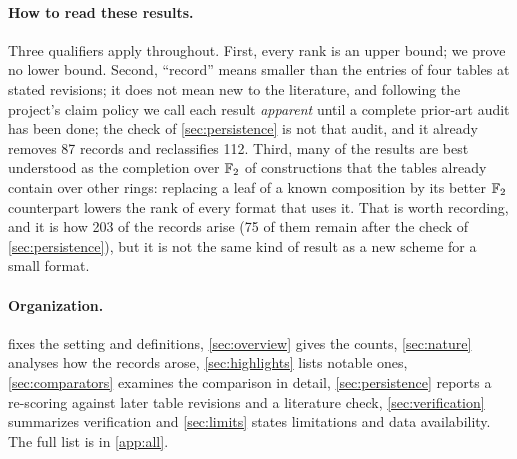\paragraph{How to read these results.}
Three qualifiers apply throughout. First, every rank is an upper bound; we prove no lower bound. Second, ``record'' means smaller than the entries of four tables at stated revisions; it does not mean new to the literature, and following the project's claim policy we call each result \emph{apparent} until a complete prior-art audit has been done; the check of \cref{sec:persistence} is not that audit, and it already removes 87 records and reclassifies 112.
Third, many of the results are best understood as the completion over ${\mathbb{F}_2}$ of constructions that the tables already contain over other rings: replacing a leaf of a known composition by its better ${\mathbb{F}_2}$ counterpart lowers the rank of every format that uses it.
That is worth recording, and it is how 203 of the records arise (75 of them remain after the check of \cref{sec:persistence}), but it is not the same kind of result as a new scheme for a small format.

\paragraph{Organization.}
 fixes the setting and definitions, \cref{sec:overview} gives the counts, \cref{sec:nature} analyses how the records arose, \cref{sec:highlights} lists notable ones, \cref{sec:comparators} examines the comparison in detail, \cref{sec:persistence} reports a re-scoring against later table revisions and a literature check,
\cref{sec:verification} summarizes verification and \cref{sec:limits} states limitations and data availability. The full list is in \cref{app:all}.
